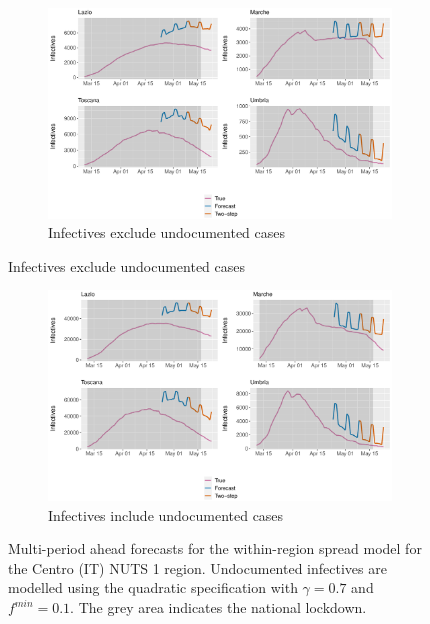\documentclass[12pt]{article}
\begin{document}
\begin{appendices}
        \begin{figure}[H]
    	    \centering
    	    \begin{subfigure}{\textwidth}
    	      \centering
    	      \includegraphics[width=0.91\linewidth]{output/model_within_lag14_forecast_full_Centro (IT).pdf}
    	      \caption{Infectives exclude undocumented cases}
    	      \label{fig:forecast_full_within_centro_regular}
    	    \end{subfigure}
        \end{figure}
        \begin{figure}[H]\ContinuedFloat
    	    \begin{subfigure}{\textwidth}
    	      \centering
    	      \includegraphics[width=0.91\linewidth]{output/model_within_lag14_forecast_full_Centro (IT)_UndocQuadratic.pdf}
    	      \caption{Infectives include undocumented cases}
    	      \label{fig:forecast_full_within_centro_undoc}
    	    \end{subfigure}
    	    \caption{Multi-period ahead forecasts for the within-region spread model for the Centro (IT) NUTS 1 region. Undocumented infectives are modelled using the quadratic specification with $\gamma = 0.7$ and $f^{min}=0.1$. The grey area indicates the national lockdown.}
    	    \label{fig:forecast_full_within_centro}
        \end{figure}
        

\end{appendices}
\end{document}
